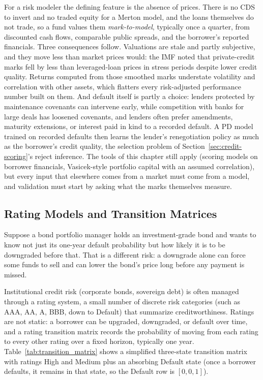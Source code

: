 \documentclass[../ai_in_finance]{subfiles}
\begin{document}
For a risk modeler the defining feature is the absence of prices. There is no CDS to invert and no traded equity for a Merton model, and the loans themselves do not trade, so a fund values them \emph{mark-to-model}, typically once a quarter, from discounted cash flows, comparable public spreads, and the borrower's reported financials. Three consequences follow. Valuations are stale and partly subjective, and they move less than market prices would: the IMF noted that private-credit marks fell by less than leveraged-loan prices in stress periods despite lower credit quality. Returns computed from those smoothed marks understate volatility and correlation with other assets, which flatters every risk-adjusted performance number built on them. And default itself is partly a choice: lenders protected by maintenance covenants can intervene early, while competition with banks for large deals has loosened covenants, and lenders often prefer amendments, maturity extensions, or interest paid in kind to a recorded default. A PD model trained on recorded defaults then learns the lender's renegotiation policy as much as the borrower's credit quality, the selection problem of Section~\ref{sec:credit-scoring}'s reject inference. The tools of this chapter still apply (scoring models on borrower financials, Vasicek-style portfolio capital with an assumed correlation), but every input that elsewhere comes from a market must come from a model, and validation must start by asking what the marks themselves measure.

\subsection{Rating Models and Transition Matrices}
\label{sec:rating-transition}

Suppose a bond portfolio manager holds an investment-grade bond and wants to know not just its one-year default probability but how likely it is to be downgraded before that. That is a different risk: a downgrade alone can force some funds to sell and can lower the bond's price long before any payment is missed.

Institutional credit risk (corporate bonds, sovereign debt) is often managed through a rating system, a small number of discrete risk categories (such as AAA, AA, A, BBB, down to Default) that summarize creditworthiness. Ratings are not static: a borrower can be upgraded, downgraded, or default over time, and a rating transition matrix records the probability of moving from each rating to every other rating over a fixed horizon, typically one year. Table~\ref{tab:transition_matrix} shows a simplified three-state transition matrix with ratings High and Medium plus an absorbing Default state (once a borrower defaults, it remains in that state, so the Default row is $[0,0,1]$).
\end{document}
